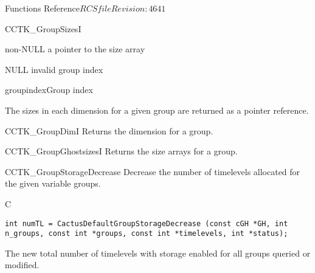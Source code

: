 \begin{cactuspart}{ Functions Reference}{$RCSfile$}{$Revision: 4641 $}
\begin{FunctionDescription}{CCTK\_GroupSizesI}
\begin{ResultSection}
\begin{Result}{non-NULL} a pointer to the size array\end{Result}
\begin{Result}{NULL} invalid group index \end{Result}
\end{ResultSection}

\begin{ParameterSection}
\begin{Parameter}{groupindex}Group index\end{Parameter}
\end{ParameterSection}

\begin{Discussion}
The sizes in each dimension for a given group are returned as a pointer reference.
\end{Discussion}

\begin{SeeAlsoSection}
\begin{SeeAlso}{CCTK\_GroupDimI}
Returns the dimension for a group.
\end{SeeAlso}
\begin{SeeAlso}{CCTK\_GroupGhostsizesI}
Returns the size arrays for a group.
\end{SeeAlso}
\end{SeeAlsoSection}
\end{FunctionDescription}


\begin{FunctionDescription}{CCTK\_GroupStorageDecrease}
\label{CCTK-GroupStorageDecrease}
Decrease the number of timelevels allocated for the given variable
groups.
\begin{SynopsisSection}
\begin{Synopsis}{C}
\begin{verbatim}int numTL = CactusDefaultGroupStorageDecrease (const cGH *GH, int n_groups, const int *groups, const int *timelevels, int *status);\end{verbatim}
\end{Synopsis}
\end{SynopsisSection}

\begin{ResultSection}
\begin{Result}{}
  The new total number of timelevels with storage enabled for all
  groups queried or modified.
\end{Result}
\end{ResultSection}


\end{FunctionDescription}
\end{cactuspart}
